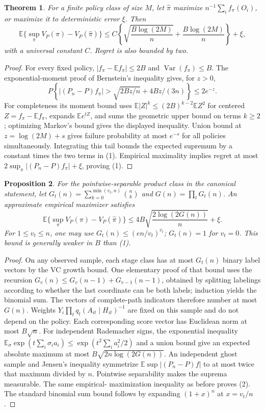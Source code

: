 \documentclass[11pt]{article}
\newtheorem{theorem}{Theorem}
\newtheorem{proposition}[theorem]{Proposition}
\theoremstyle{definition}
\begin{document}
\begin{theorem}
For a finite policy class of size $M$, let $\widehat\pi$ maximize
$n^{-1}\sum_i f_\pi(O_i)$, or maximize it to deterministic error $\xi$.
Then
\[
 \mathbb E\{\sup_\pi V_P(\pi)-V_P(\widehat\pi)\}
 \le C\left\{\sqrt{\frac{B\log(2M)}n}
                    +\frac{B\log(2M)}n\right\}+\xi,       \tag{1}
\]
with a universal constant $C$. Regret is also bounded by two.
\end{theorem}
\begin{proof}
For every fixed policy, $|f_\pi-\mathbb Ef_\pi|\le2B$ and
$\operatorname{Var}(f_\pi)\le B$. The exponential-moment proof of
Bernstein's inequality gives, for $z>0$,
\[
 P\left\{|(P_n-P)f_\pi|>
       \sqrt{2Bz/n}+4Bz/(3n)\right\}\le2e^{-z}.
\]
For completeness its moment bound uses
$\mathbb E|Z|^k\le(2B)^{k-2}\mathbb E Z^2$ for centered
$Z=f_\pi-\mathbb E f_\pi$, expands $\mathbb E e^{tZ}$, and sums the
geometric upper bound on terms $k\ge2$; optimizing Markov's bound gives
the displayed inequality. Union bound at $z=\log(2M)+s$ gives failure
probability at most $e^{-s}$ for all policies simultaneously. Integrating
this tail bounds the expected supremum by a constant times the two terms
in (1). Empirical maximality implies regret at most
$2\sup_\pi|(P_n-P)f_\pi|+\xi$, proving (1).
\end{proof}

\begin{proposition}
For the pointwise-separable product class in the canonical statement,
let $G_t(n)=\sum_{k=0}^{\min(v_t,n)}\binom nk$ and
$G(n)=\prod_t G_t(n)$. An approximate empirical maximizer satisfies
\[
 \mathbb E\{\sup_\pi V_P(\pi)-V_P(\widehat\pi)\}
 \le4B\sqrt{\frac{2\log(2G(n))}{n}}+\xi.               \tag{2}
\]
For $1\le v_t\le n$, one may use $G_t(n)\le(en/v_t)^{v_t}$;
$G_t(n)=1$ for $v_t=0$. This bound is generally weaker in $B$ than (1).
\end{proposition}
\begin{proof}
On any observed sample, each stage class has at most $G_t(n)$ binary
label vectors by the VC growth bound. One elementary proof of that bound
uses the recursion $G_v(n)\le G_v(n-1)+G_{v-1}(n-1)$, obtained by
splitting labelings according to whether the last coordinate can be both
labels; induction yields the binomial sum. The vectors of complete-path
indicators therefore number at most $G(n)$.
Weights $Y_i\prod_tq_t(A_{it}\mid H_{it})^{-1}$ are fixed on this
sample and do not depend on the policy. Each corresponding score vector
has Euclidean norm at most $B\sqrt n$. For independent Rademacher signs,
the exponential inequality
$\mathbb E_\sigma\exp(t\sum_i\sigma_i a_i)
\le\exp(t^2\sum_i a_i^2/2)$ and a union bound give an expected absolute
maximum at most $B\sqrt{2n\log(2G(n))}$.
An independent ghost sample and Jensen's inequality symmetrize
$\mathbb E\sup|(P_n-P)f|$ to at most twice that maximum divided by $n$.
Pointwise separability makes the suprema measurable. The same empirical-
maximization inequality as before proves (2). The standard binomial sum
bound follows by expanding $(1+x)^n$ at $x=v_t/n$.
\end{proof}
\end{document}
